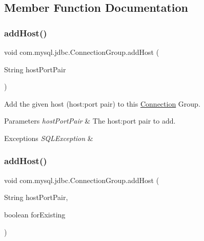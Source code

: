 \subsection{Member Function Documentation}
\mbox{\label{classcom_1_1mysql_1_1jdbc_1_1_connection_group_a3d7277b9513c4f9f7e98a62bbe6c6b4d}} 
\subsubsection{\texorpdfstring{add\+Host()}{addHost()}\hspace{0.1cm}{\footnotesize\ttfamily [1/2]}}
{\footnotesize\ttfamily void com.\+mysql.\+jdbc.\+Connection\+Group.\+add\+Host (\begin{DoxyParamCaption}\item[{String}]{host\+Port\+Pair }\end{DoxyParamCaption})}

Add the given host (host\+:port pair) to this \mbox{\hyperlink{interfacecom_1_1mysql_1_1jdbc_1_1_connection}{Connection}} Group.


\begin{DoxyParams}{Parameters}
{\em host\+Port\+Pair} & The host\+:port pair to add. \\
\hline
\end{DoxyParams}

\begin{DoxyExceptions}{Exceptions}
{\em S\+Q\+L\+Exception} & \\
\hline
\end{DoxyExceptions}
\mbox{\label{classcom_1_1mysql_1_1jdbc_1_1_connection_group_a26394f92e59f213c787876133b0a17e5}} 
\subsubsection{\texorpdfstring{add\+Host()}{addHost()}\hspace{0.1cm}{\footnotesize\ttfamily [2/2]}}
{\footnotesize\ttfamily void com.\+mysql.\+jdbc.\+Connection\+Group.\+add\+Host (\begin{DoxyParamCaption}\item[{String}]{host\+Port\+Pair,  }\item[{boolean}]{for\+Existing }\end{DoxyParamCaption})}

